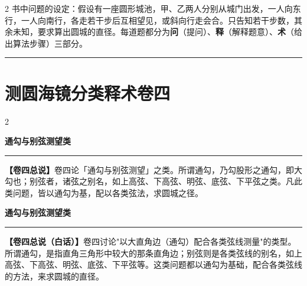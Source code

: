 \documentclass[10pt,a4paper]{article}
\newcommand{\longline}{\noindent\rule{\textwidth}{0.4pt}}
\newcommand{\volheaderclassical}[1]{%
  \begin{center}{\large\bfseries\color{volcolor} #1}\end{center}
  \vspace{0.3cm}
  \longline
  \vspace{0.3cm}
}
\newcommand{\volheadermodern}[1]{%
  \begin{center}{\large\bfseries\color{volcolor} #1}\end{center}
  \vspace{0.3cm}
  \longline
  \vspace{0.3cm}
}
\begin{document}
\begin{paracol}{2}
书中问题的设定：假设有一座圆形城池，甲、乙两人分别从城门出发，一人向东行，一人向南行，各走若干步后互相望见，或斜向行走会合。只告知若干步数，其余未知，要求算出圆城的直径。每道题都分为\textbf{问}（提问）、\textbf{释}（解释题意）、\textbf{术}（给出算法步骤）三部分。

\end{paracol}

\vspace{0.5cm}
\longline
\newpage


\section{测圆海镜分类释术卷四}
\label{sec:vol4}

\begin{paracol}{2}

\volheaderclassical{通勾与别弦测望类}

\noindent\textbf{【卷四总说】}卷四论「通勾与别弦测望」之类。所谓通勾，乃勾股形之通勾，即大勾也；别弦者，诸弦之别名，如上高弦、下高弦、明弦、底弦、下平弦之类。凡此类问题，皆以通勾为基，配以各类弦法，求圆城之径。

\switchcolumn

\volheadermodern{通勾与别弦测望类}

\noindent\textbf{【卷四总说（白话）】}卷四讨论"以大直角边（通勾）配合各类弦线测量"的类型。所谓通勾，是指直角三角形中较大的那条直角边；别弦则是各类弦线的别名，如上高弦、下高弦、明弦、底弦、下平弦等。这类问题都以通勾为基础，配合各类弦线的方法，来求圆城的直径。

\end{paracol}

\vspace{0.3cm}
\end{document}

